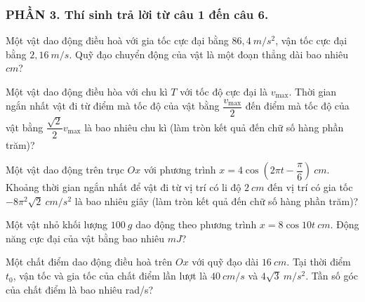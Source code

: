 \subsubsection*{PHẦN 3. Thí sinh trả lời từ câu 1 đến câu 6.}
\setcounter{ex}{0}
\begin{ex}
	Một vật dao động điều hoà với gia tốc cực đại bằng $86,4 \ m/s^2$, vận tốc cực đại bằng $2,16 \ m/s$. Quỹ đạo chuyển động của vật là một đoạn thẳng dài bao nhiêu $cm$?
\end{ex}
\begin{ex}
	Một vật dao động điều hòa với chu kì $T$ với tốc độ cực đại là $v_{\max}$. Thời gian ngắn nhất vật đi từ điểm mà tốc độ của vật bằng $\dfrac{v_{\max}}{2}$ đến điểm mà tốc độ của vật bằng $\dfrac{\sqrt{2}}{2}v_{\max}$ là bao nhiêu chu kì (làm tròn kết quả đến chữ số hàng phần trăm)?
\end{ex}
\begin{ex}
	Một vật dao động trên trục $O x$ với phương trình $x=4 \cos \left(2 \pi t-\dfrac{\pi}{6}\right)\ cm$. Khoảng thời gian ngắn nhất để vật đi từ vị trí có li độ $2 \ cm$ đến vị trí có gia tốc $-8 \pi^2 \sqrt{2}\ cm/s^2$ là bao nhiêu giây (làm tròn kết quả đến chữ số hàng phần trăm)?
\end{ex}
\begin{ex}
	Một vật nhỏ khối lượng $100 \ g$ dao động theo phương trình $x=8 \cos 10 t\ cm$. Động năng cực đại của vật bằng bao nhiêu $mJ$?
\end{ex}
\begin{ex}
	Một chất điểm dao động điều hoà trên $O x$ với quỹ đạo dài $16 \ cm$. Tại thời điểm $t_0$, vận tốc và gia tốc của chất điểm lần lượt là $40 \ cm/s$ và $4 \sqrt{3} \ m/s^2$. Tần số góc của chất điểm là bao nhiêu rad/s?
\end{ex}
